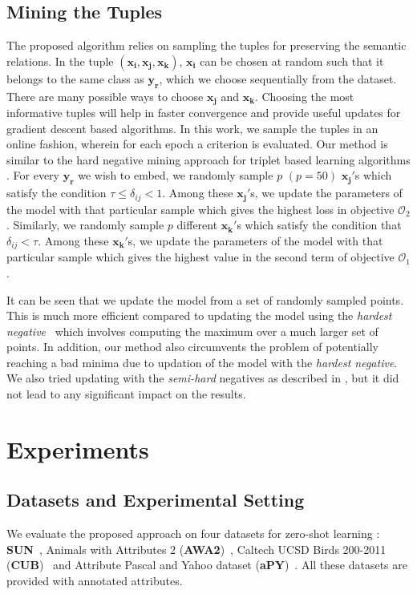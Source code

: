 \documentclass[10pt,twocolumn,letterpaper]{article}
\begin{document}
\subsection{Mining the Tuples}
\label{mining}
The proposed algorithm relies on sampling the tuples for preserving the semantic relations. 
In the tuple $(\mathbf{x_i},\mathbf{x_j},\mathbf{x_k})$, $\mathbf{x_i}$ can be chosen at random such that it belongs to the same class as $\mathbf{y_r}$, which we choose sequentially from the dataset.
There are many possible ways to choose $\mathbf{x_j}$ and $\mathbf{x_k}$. 
Choosing the most informative tuples will help in faster convergence and provide useful updates for gradient descent based algorithms. 
In this work, we sample the tuples in an online fashion, wherein for each epoch a criterion is evaluated. Our method is similar to the hard negative mining approach for triplet based learning algorithms \cite{bucher2016hard,schroff2015facenet,simo2015discriminative}.
For every $\mathbf{y_r}$ we wish to embed, we randomly sample $p$ $(p = 50)$ $\mathbf{x_j}'$s which satisfy the condition $\tau\leq\delta_{ij}<1$. Among these $\mathbf{x_j}'$s, we update the parameters of the model with that particular sample which gives the highest loss in objective $\mathcal{O}_2$.
Similarly, we randomly sample $p$ different $\mathbf{x_k}'$s which satisfy the condition that $\delta_{ij}<\tau$. Among these $\mathbf{x_k}'$s, we update the parameters of the model with that particular sample which gives the highest value in the second term of objective $\mathcal{O}_1$. 

It can be seen that we update the model from a set of randomly sampled points. 
This is much more efficient compared to updating the model using the \textit{hardest negative}~\cite{schroff2015facenet} which involves computing the maximum over a much larger set of points. In addition, our method also circumvents the problem of potentially reaching a bad minima due to updation of the model with the \textit{hardest negative}. We also tried updating with the \textit{semi-hard} negatives as described in \cite{schroff2015facenet}, but it did not lead to any significant impact on the results. 

\section{Experiments}
\label{expts}

\subsection{Datasets and Experimental Setting}
We evaluate the proposed approach on four datasets for zero-shot learning : \textbf{SUN}~\cite{xiao2010sun}, Animals with Attributes 2 (\textbf{AWA2})~\cite{xian2017zero1}, Caltech UCSD Birds 200-2011 (\textbf{CUB})~\cite{wah2011caltech} and  Attribute Pascal and Yahoo dataset (\textbf{aPY})~\cite{farhadi2009describing}. All these datasets are provided with annotated attributes. 
\end{document}
